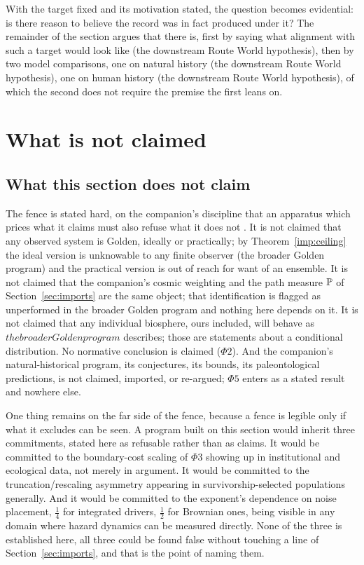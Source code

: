 With the target fixed and its motivation stated, the question becomes
evidential: is there reason to believe the record was in fact produced
under it? The remainder of the section argues that there is, first by
saying what alignment with such a target would look like
(the downstream Route World hypothesis), then by two model comparisons, one on
natural history (the downstream Route World hypothesis), one on human history
(the downstream Route World hypothesis), of which the second does not require
the premise the first leans on.


\section{What is not claimed}\label{sec:fences}

\subsection{What this section does not claim}\label{gr:sub:fence}

The fence is stated hard, on the companion's discipline that an
apparatus which prices what it claims must also refuse what it does not
\cite{AethusOptimalEarth}. It is not claimed that any observed system is Golden, ideally or
practically; by Theorem~\ref{imp:ceiling} the ideal version is
unknowable to any finite observer (the broader Golden program) and
the practical version is out of reach for want of an ensemble. It is not claimed that the companion's cosmic
weighting and the path measure $\mathbb{P}$ of
Section~\ref{sec:imports} are the same object; that
identification is flagged as unperformed in
the broader Golden program and nothing here depends on it. It is not
claimed that any individual biosphere, ours included, will behave as
$the broader Golden program$ describes; those are statements about a
conditional distribution. No normative conclusion is claimed
($\Phi2$). And the companion's natural-historical program, its
conjectures, its bounds, its paleontological predictions, is not
claimed, imported, or re-argued; $\Phi5$ enters as a stated result and
nowhere else.

One thing remains on the far side of the fence, because a fence is
legible only if what it excludes can be seen. A program built on this
section would inherit three commitments, stated here as refusable rather
than as claims. It would be committed to the boundary-cost scaling of
$\Phi3$ showing up in institutional and ecological data, not merely in
argument. It would be committed to the truncation/rescaling asymmetry
appearing in survivorship-selected populations generally. And it would
be committed to the exponent's dependence on noise placement, $\tfrac14$
for integrated drivers, $\tfrac12$ for Brownian ones, being visible
in any domain where hazard dynamics can be measured directly. None of
the three is established here, all three could be found false without
touching a line of Section~\ref{sec:imports}, and that is the
point of naming them.


